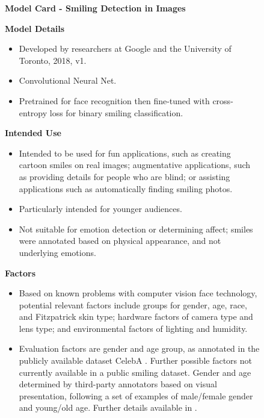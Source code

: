 \begin{figure}
\raggedright
\begin{framed}
\begin{center}{\LARGE {\bf Model Card - Smiling Detection in Images}}\end{center} 
\vspace{1em}
    \begin{minipage}{.615\textwidth}
{\bf Model Details}
\begin{itemize}[leftmargin=*]
\item Developed by researchers at Google and the University of Toronto, 2018, v1.
\item Convolutional Neural Net.
\item Pretrained for face recognition then fine-tuned with cross-entropy loss for binary smiling classification.
\end{itemize}

\vspace{.25em}
{\bf Intended Use}
\begin{itemize}[leftmargin=*]
\item Intended to be used for fun applications, such as creating cartoon smiles on real images; augmentative applications, such as providing details for people who are blind; or assisting applications such as automatically finding smiling photos.
\item Particularly intended for younger audiences. 
\item Not suitable for emotion detection or determining affect; smiles were annotated based on physical appearance, and not underlying emotions.
\end{itemize}

\vspace{.25em}
{\bf Factors}
\begin{itemize}[leftmargin=*]
\item Based on known problems with computer vision face technology, potential relevant factors include groups for gender, age, race, and Fitzpatrick skin type; hardware factors of camera type and lens type; and environmental factors of lighting and humidity.
\item Evaluation factors are gender and age group, as annotated in the publicly available dataset CelebA \cite{LiuEtAl2015}.  Further possible factors not currently available in a public smiling dataset.  Gender and age determined by third-party annotators based on visual presentation, following a set of examples of male/female gender and young/old age.  Further details available in \cite{LiuEtAl2015}.
\end{itemize}


\end{minipage}
\end{framed}
\end{figure}
